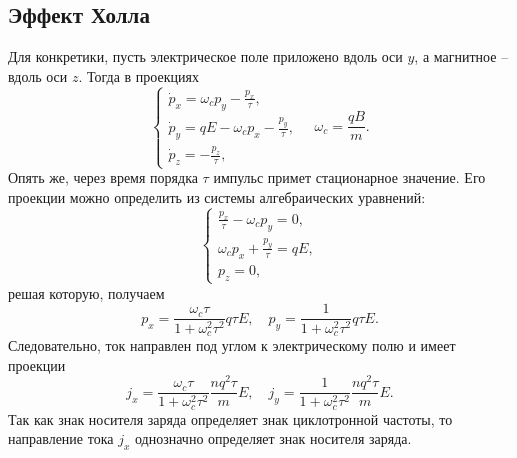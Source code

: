\subsection{Эффект Холла}
    Для конкретики, пусть электрическое поле приложено вдоль оси \( y \), а
    магнитное -- вдоль оси \( z \). Тогда в проекциях
    \[
        \left\{
            \begin{array}{l}
                \dot{p}_x = \omega_c p_y - \frac{p_x}{\tau}, \\
                \dot{p}_y = qE - \omega_c p_x - \frac{p_y}{\tau}, \\
                \dot{p}_z = -\frac{p_z}{\tau},
            \end{array}
        \right.
        \quad
        \omega_c = \frac{qB}{m}.
    \]
    Опять же, через время порядка \( \tau \) импульс примет стационарное
    значение. Его проекции можно определить из системы алгебраических уравнений:
    \[
        \left\{
            \begin{array}{l}
                \frac{p_x}{\tau} - \omega_c p_y = 0,  \\
                \omega_c p_x + \frac{p_y}{\tau} = qE, \\
                p_z = 0,
            \end{array}
        \right.
    \]
    решая которую, получаем
    \[
        p_x = \frac{\omega_c\tau}{1+\omega_c^2\tau^2}q\tau E,\quad
        p_y = \frac{1}{1+\omega_c^2\tau^2}q\tau E.
    \]
    Следовательно, ток направлен под углом к электрическому полю и имеет
    проекции
    \[
        j_x = \frac{\omega_c\tau}{1+\omega_c^2\tau^2}\frac{nq^2\tau}{m} E,\quad
        j_y = \frac{1}{1+\omega_c^2\tau^2}\frac{nq^2\tau}{m} E.
    \]
    Так как знак носителя заряда определяет знак циклотронной частоты, то
    направление тока \( j_x \) однозначно определяет знак носителя заряда.

